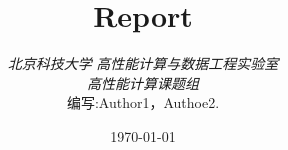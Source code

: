 \begin{titlepage}
    \title{Report}
    \author{
    \emph{北京科技大学} \emph{高性能计算与数据工程实验室} \\
    \emph{高性能计算课题组} \\[8cm]
    编写:Author1，Authoe2.
    }

    \date{\today}

    \maketitle
    \thispagestyle{empty}
\end{titlepage}
